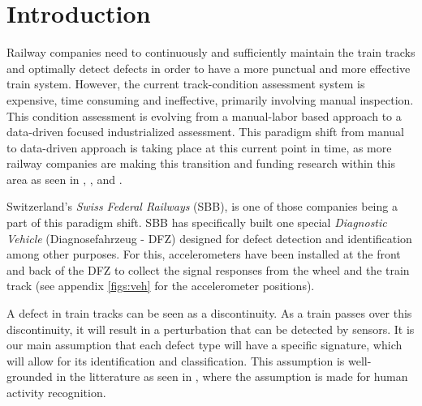 



%



\maketitle

%
{
  \hypersetup{linkcolor=black}
  \tableofcontents
   
}
\newpage
\chapter{Introduction}
Railway companies need to continuously and sufficiently maintain the train tracks and optimally detect defects in order to have a more punctual and more effective train system. However, the current track-condition assessment system is expensive, time consuming and ineffective, primarily involving manual inspection. This condition assessment is evolving from a manual-labor based approach to a data-driven focused industrialized assessment. This paradigm shift from manual to data-driven approach is taking place at this current point in time, as more railway companies are making this transition and funding research within this area as seen in \cite{Sharma2018DatadrivenOO}, \cite{modeltrain}, \cite{Deutsche21:online} and \cite{Howdigit41:online}.

Switzerland's \textit{Swiss Federal Railways} (SBB), is one of those companies being a part of this paradigm shift. SBB has specifically built one special \textit{Diagnostic Vehicle} (Diagnosefahrzeug - DFZ) designed for defect detection and identification among other purposes. For this, accelerometers have been installed at the front and back of the DFZ to collect the signal responses from the wheel and the train track (see appendix \ref{figs:veh} for the accelerometer positions).

A defect in train tracks can be seen as a discontinuity. As a train passes over this discontinuity, it will result in a perturbation that can be detected by sensors. It is our main assumption that each defect type will have a specific signature, which will allow for its identification and classification. This assumption is well-grounded in the litterature as seen in \cite{Introduc31:online}, \cite{pmid28590422} where the assumption is made for human activity recognition.

